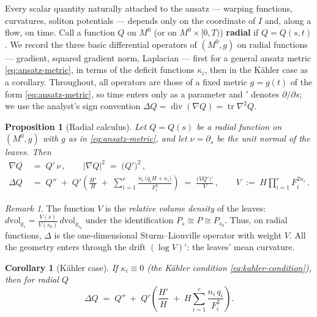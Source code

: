 \documentclass[11pt]{amsart}
\theoremstyle{plain}
\numberwithin{equation}{section}
\newtheorem{proposition}[theorem]{Proposition}
\newtheorem{corollary}[theorem]{Corollary}
\theoremstyle{definition}
\theoremstyle{remark}
\newtheorem*{remarkx}{Remark}
\begin{document}
Every scalar quantity naturally attached to the ansatz --- warping functions, curvatures, soliton potentials --- depends only on the coordinate of $I$ and, along a flow, on time. Call a function $Q$ on $M^0$ (or on $M^0 \times [0,T)$) \textbf{radial} if $Q = Q(s, t)$. We record the three basic differential operators of $(M^0, g)$ on radial functions --- gradient, squared gradient norm, Laplacian --- first for a general ansatz metric \eqref{eq:ansatz-metric}, in terms of the deficit functions $\kappa_i$, then in the Kähler case as a corollary. Throughout, all operators are those of a fixed metric $g = g(t)$ of the form \eqref{eq:ansatz-metric}, so time enters only as a parameter and ${}'$ denotes $\partial / \partial s$; we use the analyst's sign convention $\Delta Q = \operatorname{div}( \nabla Q ) = \operatorname{tr} \nabla^2 Q$. %

\begin{proposition}[Radial calculus]\label{prop:radial-calculus}
	Let $Q = Q(s)$ be a radial function on $(M^0, g)$ with $g$ as in \eqref{eq:ansatz-metric}, and let $\nu = \partial_s$ be the unit normal of the leaves. Then
	\begin{align}\label{eq:radial-gradient}
		\nabla Q &\;=\; Q'\, \nu \,, \qquad \big| \nabla Q \big|^2 \;=\; \big( Q' \big)^2 \,,\\
		\label{eq:radial-laplacian}
		\Delta Q &\;=\; Q'' \;+\; Q' \left( \frac{H'}{H} \;+\; \sum_{i=1}^r \frac{n_i\, \big( q_i H + \kappa_i \big)}{F_i^2} \right) \;=\; \frac{\big( V Q' \big)'}{V} \,, \qquad V \;:=\; H \prod_{i=1}^r F_i^{2 n_i} \,.
	\end{align}	
\end{proposition}



\begin{remarkx}
	The function $V$ is the \emph{relative volume density} of the leaves: $d\mathrm{vol}_{g_s} = \tfrac{V(s)}{V(s_0)}\, d\mathrm{vol}_{g_{s_0}}$ under the identification $P_s \cong P \cong P_{s_0}$. Thus, on radial functions, $\Delta$ is the one-dimensional Sturm--Liouville operator with weight $V$. All the geometry enters through the drift $(\log V)'$: the leaves' mean curvature.
\end{remarkx}

\begin{corollary}[Kähler case]\label{cor:kahler-laplacian}
	If $\kappa_i \equiv 0$ (the Kähler condition \eqref{eq:kahler-condition}), then for radial $Q$
	\begin{equation}\label{eq:kahler-laplacian}
		\Delta Q \;=\; Q'' \;+\; Q' \left( \frac{H'}{H} \;+\; H \sum_{i=1}^r \frac{n_i\, q_i}{F_i^2} \right).
	\end{equation}
\end{corollary}
\end{document}
